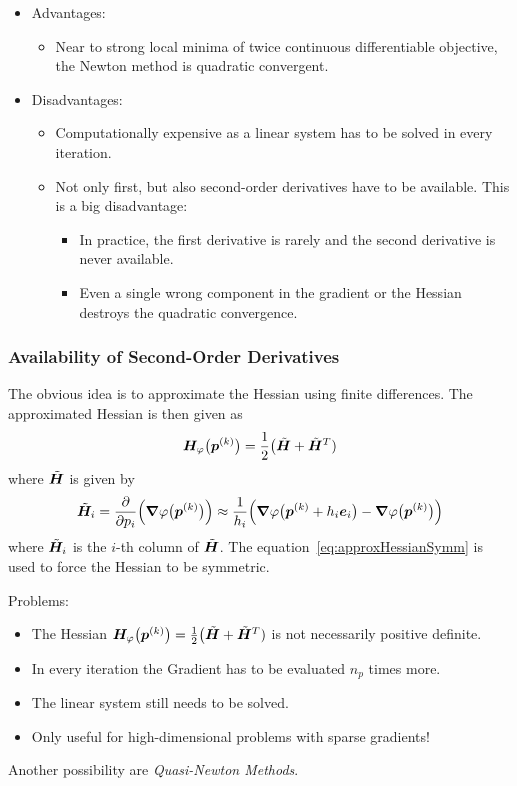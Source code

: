 			\begin{itemize}
				\item Advantages:
					\begin{itemize}
						\item Near to strong local minima of twice continuous differentiable objective, the Newton method is quadratic convergent.
					\end{itemize}
				\item Disadvantages:
					\begin{itemize}
						\item Computationally expensive as a linear system has to be solved in every iteration.
						\item Not only first, but also second-order derivatives have to be available. This is a big disadvantage:
							\begin{itemize}
								\item In practice, the first derivative is rarely and the second derivative is never available.
								\item Even a single wrong component in the gradient or the Hessian destroys the quadratic convergence.
							\end{itemize}
					\end{itemize}
			\end{itemize}

			\subsubsection{Availability of Second-Order Derivatives}
				The obvious idea is to approximate the Hessian using finite differences. The approximated Hessian is then given as
				\begin{align*}
					\bm{H}_\varphi\big(\bm{p}^{(k)}\big) = \frac{1}{2} \big( \tilde{\bm{H}} + \tilde{\bm{H}}^T )  \label{eq:approxHessianSymm}
				\end{align*}
				where \(\tilde{\bm{H}}\) is given by
				\begin{align*}
					\tilde{\bm{H}}_i = \pdv{p_i} \Big( \grad{\varphi}\big(\bm{p}^{(k)}\big) \Big) \approx \frac{1}{h_i} \Big( \grad{\varphi}\big(\bm{p}^{(k)} + h_i \bm{e}_i\big) - \grad{\varphi}\big(\bm{p}^{(k)}\big) \Big)
				\end{align*}
				where \( \tilde{\bm{H}}_i \) is the \(i\)-th column of \(\tilde{\bm{H}}\). The equation~\eqref{eq:approxHessianSymm} is used to force the Hessian to be symmetric.

				Problems:
				\begin{itemize}
					\item The Hessian \( \bm{H}_\varphi\big(\bm{p}^{(k)}\big) = \frac{1}{2} \big( \tilde{\bm{H}} + \tilde{\bm{H}}^T ) \) is not necessarily positive definite.
					\item In every iteration the Gradient has to be evaluated \(n_p\) times more.
					\item The linear system still needs to be solved.
					\item Only useful for high-dimensional problems with sparse gradients!
				\end{itemize}
				Another possibility are \emph{Quasi-Newton Methods}.

